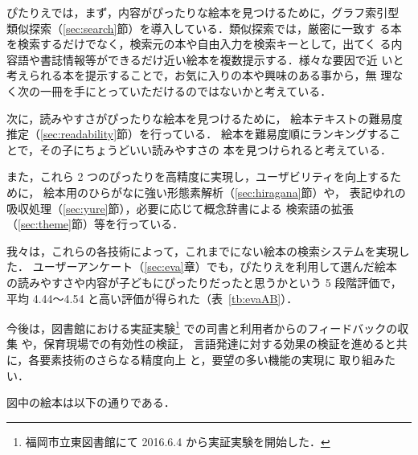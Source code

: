 \documentclass[japanese]{jnlp_1.4}
\begin{document}
ぴたりえでは，まず，内容がぴったりな絵本を見つけるために，グラフ索引型
類似探索（\ref{sec:search}節）を導入している．類似探索では，厳密に一致す
る本を検索するだけでなく，検索元の本や自由入力を検索キーとして，出てく
る内容語や書誌情報等ができるだけ近い絵本を複数提示する．様々な要因で近
いと考えられる本を提示することで，お気に入りの本や興味のある事から，無
理なく次の一冊を手にとっていただけるのではないかと考えている．

次に，読みやすさがぴったりな絵本を見つけるために，
絵本テキストの難易度推定（\ref{sec:readability}節）を行っている．
絵本を難易度順にランキングすることで，その子にちょうどいい読みやすさの
本を見つけられると考えている．

また，これら 2 つのぴったりを高精度に実現し，ユーザビリティを向上するために，
絵本用のひらがなに強い形態素解析（\ref{sec:hiragana}節）や，
表記ゆれの吸収処理（\ref{sec:yure}節），必要に応じて概念辞書による
検索語の拡張（\ref{sec:theme}節）等を行っている．

我々は，これらの各技術によって，これまでにない絵本の検索システムを実現した．
ユーザーアンケート（\ref{sec:eva}章）でも，ぴたりえを利用して選んだ絵本
の読みやすさや内容が子どもにぴったりだったと思うかという 5 段階評価で，
平均 4.44〜4.54 と高い評価が得られた（表~\ref{tb:evaAB}）．

今後は，図書館における実証実験\footnote{福岡市立東図書館にて 2016.6.4 から実証実験を開始した．} での司書と利用者からのフィードバックの収
集
\cite{Gohara:Yamada:Pitarie:etal:2016j,Sasaki:Gohara:Pitarie:etal:2016j,Otake:Gohara:Pitarie:etal:2017j}
や，保育現場での有効性の検証\cite{Fujimoto:Saito:Pitarie:etal:2017j}，
言語発達に対する効果の検証を進めると共に，各要素技術のさらなる精度向上
と，要望の多い機能の実現\cite{Yasuo:Hattori:Fujita:Matsushita:2017j}に
取り組みたい．



\clearpage





\appendix

図中の絵本は以下の通りである．
\end{document}
